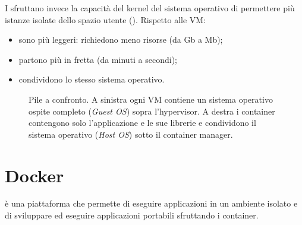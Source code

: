 I  sfruttano invece la capacità del kernel del sistema operativo di permettere più istanze isolate
dello spazio utente (). Rispetto alle VM:
\begin{itemize}
  \item[$+$] sono più leggeri: richiedono meno risorse (da Gb a Mb);
  \item[$+$] partono più in fretta (da minuti a secondi);
  \item[$-$] condividono lo stesso sistema operativo.
\end{itemize}

\begin{figure}[ht]
\centering
{}
\caption{Pile a confronto. A sinistra ogni VM contiene un sistema operativo ospite completo (\emph{Guest OS}) sopra
l'hypervisor. A destra i container contengono solo l'applicazione e le sue librerie e condividono il sistema operativo
(\emph{Host OS}) sotto il container manager.}
\label{fig:container-vm}
\end{figure}

\section{Docker}
\label{sec:container-docker}

\begin{definizione}[Docker]
 è una piattaforma che permette di eseguire applicazioni in un ambiente isolato e di sviluppare ed
eseguire applicazioni portabili sfruttando i container.
\end{definizione}


